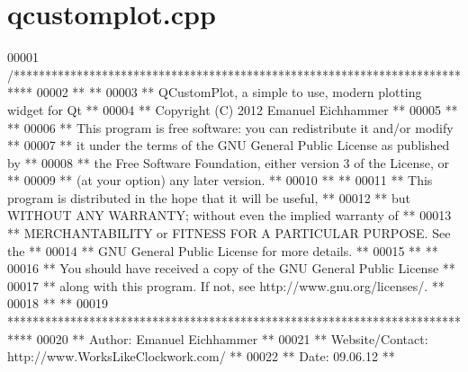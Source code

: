 \hypertarget{a00115_source}{\section{qcustomplot.\+cpp}
\label{a00115_source}
}

\begin{DoxyCode}
00001 \textcolor{comment}{/***************************************************************************}
00002 \textcolor{comment}{**                                                                        **}
00003 \textcolor{comment}{**  QCustomPlot, a simple to use, modern plotting widget for Qt           **}
00004 \textcolor{comment}{**  Copyright (C) 2012 Emanuel Eichhammer                                 **}
00005 \textcolor{comment}{**                                                                        **}
00006 \textcolor{comment}{**  This program is free software: you can redistribute it and/or modify  **}
00007 \textcolor{comment}{**  it under the terms of the GNU General Public License as published by  **}
00008 \textcolor{comment}{**  the Free Software Foundation, either version 3 of the License, or     **}
00009 \textcolor{comment}{**  (at your option) any later version.                                   **}
00010 \textcolor{comment}{**                                                                        **}
00011 \textcolor{comment}{**  This program is distributed in the hope that it will be useful,       **}
00012 \textcolor{comment}{**  but WITHOUT ANY WARRANTY; without even the implied warranty of        **}
00013 \textcolor{comment}{**  MERCHANTABILITY or FITNESS FOR A PARTICULAR PURPOSE.  See the         **}
00014 \textcolor{comment}{**  GNU General Public License for more details.                          **}
00015 \textcolor{comment}{**                                                                        **}
00016 \textcolor{comment}{**  You should have received a copy of the GNU General Public License     **}
00017 \textcolor{comment}{**  along with this program.  If not, see http://www.gnu.org/licenses/.   **}
00018 \textcolor{comment}{**                                                                        **}
00019 \textcolor{comment}{****************************************************************************}
00020 \textcolor{comment}{**           Author: Emanuel Eichhammer                                   **}
00021 \textcolor{comment}{**  Website/Contact: http://www.WorksLikeClockwork.com/                   **}
00022 \textcolor{comment}{**             Date: 09.06.12                                             **}

\end{DoxyCode}
